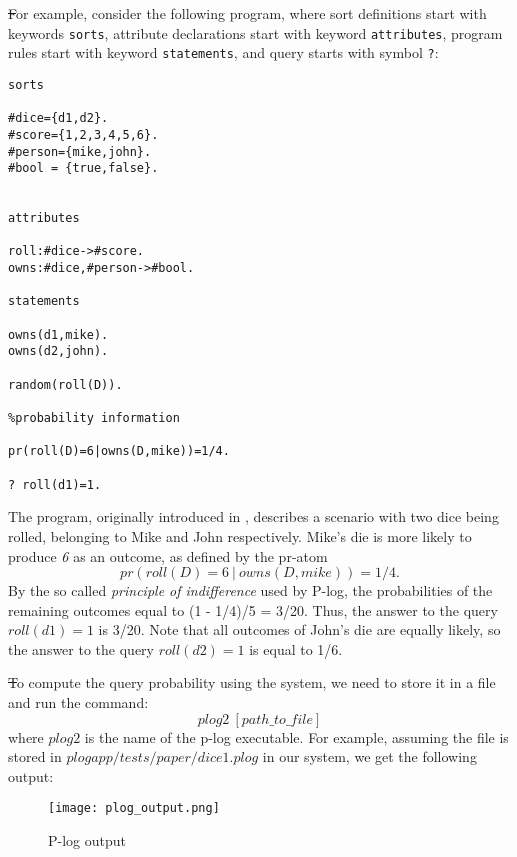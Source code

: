 \documentclass[12pt, letterpaper]{article}
\begin{document}
\st
For example, consider the following program, where sort definitions start with keywords \texttt{sorts}, attribute declarations start with keyword \texttt{attributes}, program rules start with keyword \texttt{statements}, and query starts with symbol \texttt{?}:
\begin{verbatim}
sorts

#dice={d1,d2}.
#score={1,2,3,4,5,6}.
#person={mike,john}.
#bool = {true,false}.


attributes

roll:#dice->#score.
owns:#dice,#person->#bool.

statements

owns(d1,mike).
owns(d2,john).

random(roll(D)).

%probability information

pr(roll(D)=6|owns(D,mike))=1/4.

? roll(d1)=1.
\end{verbatim}


The program, originally introduced in \cite{gelfond2014knowledge}, describes a scenario with two dice being rolled, belonging to Mike and John respectively.
Mike's die is more likely to produce \textit{6} as an outcome, as defined by the pr-atom
$$pr(roll(D)=6~|~owns(D,mike))=1/4.$$
By the so called \textit{principle of indifference} used by P-log, the probabilities of the remaining outcomes equal to (1 - 1/4)/5 = 3/20.
Thus, the answer to the query $roll(d1)=1$ is 3/20. Note that all outcomes of John's die are equally likely, so the answer to the query $roll(d2)=1$ is equal to 1/6.


\st
To compute the query probability using the system, we need to store it in a file and run the command:
$$plog2~[path\_to\_file]$$
where $plog2$ is the name of the p-log executable. For example, assuming the file is stored in $plogapp/tests/paper/dice1.plog$ in our system, we get the following output:

\begin{figure}[ht]
\centering
\texttt{[image: plog\_output.png]}
\caption{P-log output}
\label{fig:plog_output}
\end{figure}
\end{document}
